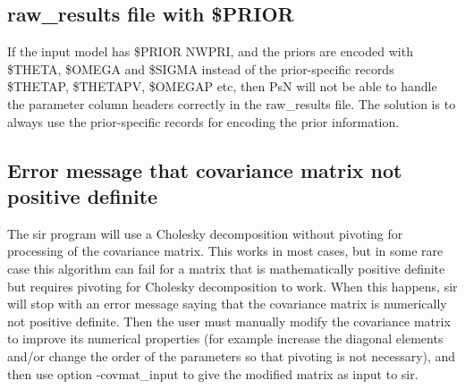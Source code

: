 \subsection*{raw\_results file with \$PRIOR}
If the input model has \$PRIOR NWPRI, and the priors are encoded with \$THETA, \$OMEGA and \$SIGMA instead of the
prior-specific records \$THETAP, \$THETAPV, \$OMEGAP etc, then PsN will not be able to handle the parameter column
headers correctly in the raw\_results file. The solution is to always use the prior-specific records for
encoding the prior information.
\subsection*{Error message that covariance matrix not positive definite}
The sir program will use a Cholesky decomposition without pivoting for processing of the covariance matrix. 
This works in most cases, but in some rare case this algorithm can fail for a matrix that is mathematically positive definite
but requires pivoting for Cholesky decomposition to work.
When this happens, sir will stop with an error message saying that the covariance matrix is numerically not positive definite.
Then the user must manually modify the covariance matrix to improve its numerical properties (for example increase the diagonal elements
and/or change the order of the parameters so that pivoting is not necessary),
and then use option -covmat\_input to give the modified matrix as input to sir. 



